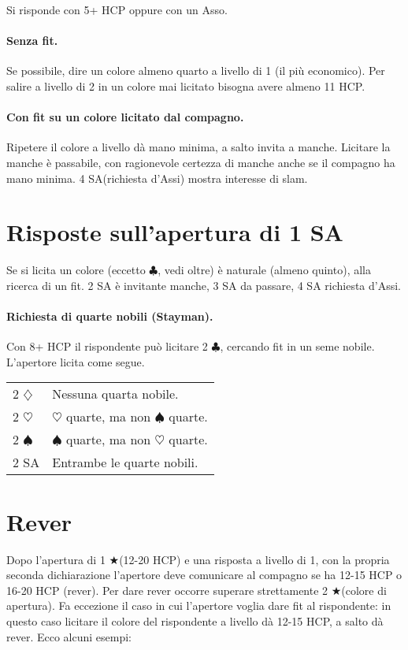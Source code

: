 \documentclass[a4paper,10pt]{article}
\renewcommand{\c}{$\clubsuit$\xspace}
\renewcommand{\d}{$\diamondsuit$\xspace}
\newcommand{\h}{$\heartsuit$\xspace}
\newcommand{\s}{$\spadesuit$\xspace}
\renewcommand{\j}{$\bigstar$\xspace}
\newcommand{\sa}{SA\xspace}
\newcommand{\smallspace}{\vskip0.3cm}
\newenvironment{twocol}
  {\smallspace\noindent\begin{tabular}{l p{0.78\textwidth}}}
  {\end{tabular}\smallspace}
\begin{document}
Si risponde con 5+ HCP oppure con un Asso.

\paragraph{Senza fit.} Se possibile, dire un colore almeno quarto a livello di 1 (il più economico). Per salire a livello di 2 in un colore mai licitato bisogna avere almeno 11 HCP.

\paragraph{Con fit su un colore licitato dal compagno.} Ripetere il colore a livello dà mano minima, a salto invita a manche. Licitare la manche è passabile, con ragionevole certezza di manche anche se il compagno ha mano minima. 4 \sa (richiesta d'Assi) mostra interesse di slam.


\section{Risposte sull'apertura di 1 SA}

Se si licita un colore (eccetto \c, vedi oltre) è naturale (almeno quinto), alla ricerca di un fit. 2 \sa è invitante manche, 3 \sa da passare, 4 \sa richiesta d'Assi.

\paragraph{Richiesta di quarte nobili (Stayman).} Con 8+ HCP il rispondente può licitare 2 \c, cercando fit in un seme nobile. L'apertore licita come segue.

\begin{twocol}
 2 \d & Nessuna quarta nobile.\\
 2 \h & \h quarte, ma non \s quarte.\\
 2 \s & \s quarte, ma non \h quarte.\\
 2 SA & Entrambe le quarte nobili.
\end{twocol}


\section{Rever}

Dopo l'apertura di 1 \j (12-20 HCP) e una risposta a livello di 1, con la propria seconda dichiarazione l'apertore deve comunicare al compagno se ha 12-15 HCP o 16-20 HCP (rever). Per dare rever occorre superare strettamente 2 \j (colore di apertura). Fa eccezione il caso in cui l'apertore voglia dare fit al rispondente: in questo caso licitare il colore del rispondente a livello dà 12-15 HCP, a salto dà rever. Ecco alcuni esempi:
\end{document}
